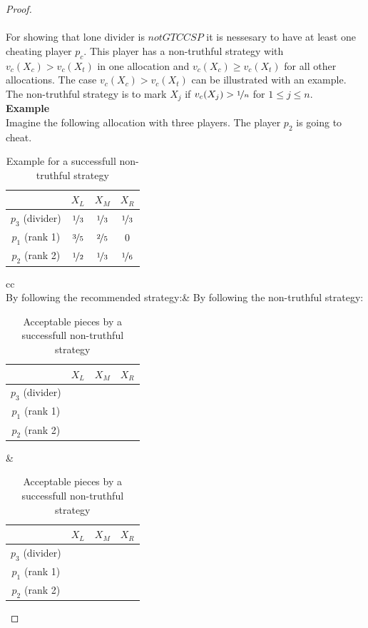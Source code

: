 \begin{proof}
\textcolor{white}{x}\\\\
For showing that lone divider is $notGTCCSP$ it is nessesary to have at least one cheating player $p_c$. This player has a non-truthful strategy with $v_c(X_c)>v_c(X_t)$ in one allocation and $v_c(X_c) \geq v_c(X_t)$ for all other allocations. The case $v_c(X_c)>v_c(X_t)$ can be illustrated with an example. 
The non-truthful strategy is to mark $X_j$ if $v_c(X_j) > \nicefrac{1}{n}$ for $1 \leq j \leq n$.\\
\newline
\textbf{Example}\\
\newline
Imagine the following allocation with three players. The player $p_2$ is going to cheat.
		\begin{table}[htb]
		\centering
		\renewcommand{\arraystretch}{1.2}
		\begin{tabular}{c|ccc}
		& $X_L$& $X_M$& $X_R$\\
		\hline
		$p_3$ (divider)  & $\nicefrac{1}{3}$ & {$\nicefrac{1}{3}$} & $\nicefrac{1}{3}$ \\
  $p_1$ (rank 1) & {$\nicefrac{3}{5}$} & $\nicefrac{2}{5}$ & $0$\\
  $p_2$ (rank 2)& {$\nicefrac{1}{2}$} & $\nicefrac{1}{3}$ & $\nicefrac{1}{6}$
 		\end{tabular}
 		
\caption{Example for a successfull non-truthful strategy}\label{Table10}
\end{table}

		\begin{table}[htb]
		\centering
		\renewcommand{\arraystretch}{1.2}
		\begin{tabular}{cc}
		\\
		By following the recommended strategy:& By following the non-truthful strategy:\\
 		\begin{tabular}{c|ccc}
		& $X_L$& $X_M$& $X_R$\\
		\hline
		$p_3$ (divider)  &  \Checkmark &  \Checkmark &  \Checkmark \\
  $p_1$ (rank 1) &  \Checkmark & \Checkmark &  \XSolidBrush \\
  $p_2$ (rank 2)&  \Checkmark &  \Checkmark & \XSolidBrush
 		\end{tabular}&
 		\begin{tabular}{c|ccc}
		& $X_L$& $X_M$& $X_R$\\
		\hline
		$p_3$ (divider)  &  \Checkmark &  \Checkmark &  \Checkmark \\
  $p_1$ (rank 1) &  \Checkmark & \Checkmark &  \XSolidBrush \\
  $p_2$ (rank 2)&  \Checkmark & \XSolidBrush & \XSolidBrush
 		\end{tabular}
 		\end{tabular}
 		
\caption{Acceptable pieces by a successfull non-truthful strategy}\label{Table11}
\end{table}
\end{proof}
